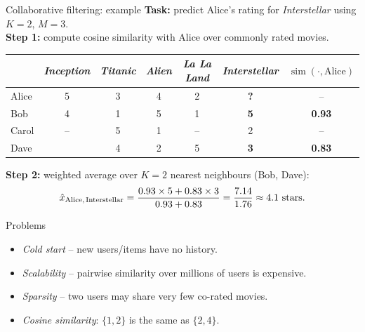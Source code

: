 \documentclass[aspectratio=169,t]{beamer}
\begin{document}
\begin{frame}{Collaborative filtering: example}
  \textbf{Task:} predict Alice's rating for \textit{Interstellar} using $K=2$, $M=3$.\\[0.1cm]
  \textbf{Step 1:} compute cosine similarity with Alice over commonly rated movies.

  \vspace{0.12cm}
  \begin{center}
  \begin{tabular}{lcccccc}
    \toprule
    & \textit{Inception} & \textit{Titanic} & \textit{Alien} & \textit{La La Land} & \textit{Interstellar} & $\operatorname{sim}(\cdot,\text{Alice})$ \\
    \midrule
    \cellcolor{blue!12}Alice & \cellcolor{blue!12}5 & \cellcolor{blue!12}3 & \cellcolor{blue!12}4 & \cellcolor{blue!12}2 & \cellcolor{accentred!25}\textbf{?} & \cellcolor{blue!12}-- \\
    \cellcolor{green!15}Bob   & \cellcolor{green!15}4 & \cellcolor{green!15}1 & \cellcolor{green!15}5 & \cellcolor{green!15}1 & \cellcolor{green!15}\textbf{5} & \cellcolor{green!15}\textbf{0.93} \\
    Carol & -- & 5 & 1 & -- & 2 & -- \\
    \cellcolor{green!7}Dave  & \cellcolor{green!7}{--} & \cellcolor{green!7}4 & \cellcolor{green!7}2 & \cellcolor{green!7}5 & \cellcolor{green!7}\textbf{3} & \cellcolor{green!7}\textbf{0.83} \\
    \bottomrule
  \end{tabular}
  \end{center}

  \vspace{0.1cm}
  \textbf{Step 2:} weighted average over $K=2$ nearest neighbours (Bob, Dave):
  $$\hat{x}_{\text{Alice,\,Interstellar}}
    = \frac{0.93 \times 5 + 0.83 \times 3}{0.93 + 0.83}
    = \frac{7.14}{1.76} \approx 4.1\text{ stars}.$$
\end{frame}

\begin{frame}{Problems}
  \begin{itemize}
    \item \emph{Cold start} -- new users/items have no history.
    \item \emph{Scalability} -- pairwise similarity over millions of users is expensive.
    \item \emph{Sparsity} -- two users may share very few co-rated movies.
    \item \emph{Cosine similarity}: $\{1, 2\}$ is the same as $\{2, 4\}$.
  \end{itemize}
\end{frame}
\end{document}
